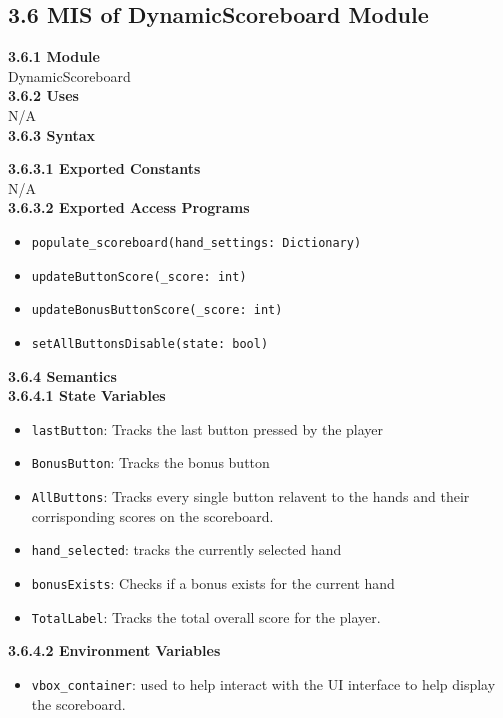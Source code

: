 \documentclass[12pt, titlepage]{article}
\begin{document}
\subsection*{3.6 MIS of DynamicScoreboard Module}
\textbf{3.6.1 Module}\\
 DynamicScoreboard\\

\noindent \textbf{3.6.2 Uses}\\
N/A \\

\noindent \textbf{3.6.3 Syntax}

\noindent \textbf{3.6.3.1 Exported Constants}\\
N/A\\

\textbf{3.6.3.2 Exported Access Programs}
\begin{itemize}
	\item \texttt{populate\_scoreboard(hand\_settings: Dictionary)}
	\item \texttt{updateButtonScore(\_score: int)}
	\item \texttt{updateBonusButtonScore(\_score: int)}
	\item \texttt{setAllButtonsDisable(state: bool)}
	
	
\end{itemize}

\noindent \textbf{3.6.4 Semantics}\\
\textbf{3.6.4.1 State Variables}\\
\begin{itemize}
	\item \texttt{lastButton}: Tracks the last button pressed by the player
	\item \texttt{BonusButton}: Tracks the bonus button 
	\item \texttt{AllButtons}: Tracks every single button relavent to the hands and their corrisponding scores on the scoreboard.
	\item \texttt{hand\_selected}: tracks the currently selected hand
	\item \texttt{bonusExists}: Checks if a bonus exists for the current hand
	\item \texttt{TotalLabel}: Tracks the total overall score for the player.

\end{itemize}

\textbf{3.6.4.2 Environment Variables}

\begin{itemize}
	\item \texttt{vbox\_container}: used to help interact with the UI interface to help display the scoreboard. 
\end{itemize}
\end{document}
